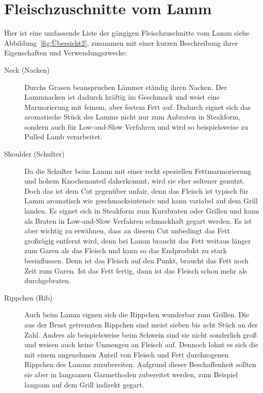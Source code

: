 \section{Fleischzuschnitte vom Lamm}
Hier ist eine umfassende Liste der gängigen Fleischzuschnitte vom Lamm siehe 
Abbildung~\vref{fig:Übersicht2}, zusammen mit einer kurzen Beschreibung 
ihrer Eigenschaften und Verwendungszwecke:

\begin{description}
	\item [Neck  (Nacken)]
	Durchs Grasen beanspruchen Lämmer ständig ihren Nacken. Der 
	Lammnacken ist dadurch kräftig im Geschmack und weist eine Marmorierung 
	mit feinem, aber festem Fett auf. Dadurch eignet sich das aromatische Stück 
	des Lamms nicht nur zum Anbraten in Steakform, sondern auch für 
	Low-and-Slow Verfahren und wird so beispielsweise zu Pulled Lamb 
	verarbeitet.

	\item [Shoulder (Schulter)]
	Da die Schulter beim Lamm mit einer recht speziellen Fettmarmorierung und 
	hohem Knochenanteil daherkommt, wird sie eher seltener genutzt. Doch das 
	ist dem Cut gegenüber unfair, denn das Fleisch ist typisch für Lamm 
	aromatisch wie geschmacksintensiv und kann variabel auf dem Grill landen. 
	Es eignet sich in Steakform zum Kurzbraten oder Grillen und kann als Braten 
	in Low-and-Slow Verfahren schmackhaft gegart werden.
	Es ist aber wichtig zu erwähnen, dass an diesem Cut unbedingt das Fett 
	großzügig entfernt wird, denn bei Lamm braucht das Fett weitaus länger zum 
	Garen als das Fleisch und kann so das Endprodukt zu stark beeinflussen. 
	Denn ist das Fleisch auf den Punkt, braucht das Fett noch Zeit zum Garen. 
	Ist das Fett fertig, dann ist das Fleisch schon mehr als durchgebraten.

	\item [Rippchen (Rib)]
	Auch beim Lamm eignen sich die Rippchen wunderbar zum Grillen. Die aus 
	der Brust getrennten Rippchen sind meist sieben bis acht Stück an der Zahl. 
	Anders als beispielsweise beim Schwein sind sie nicht sonderlich groß und 
	weisen auch keine Unmengen an Fleisch auf. Dennoch lohnt es sich die mit 
	einem angenehmen Anteil von Fleisch und Fett durchzogenen Rippchen des 
	Lamms zuzubereiten. Aufgrund dieser Beschaffenheit sollten sie aber in 
	langsamen Garmethoden zubereitet werden, zum Beispiel langsam auf dem 
	Grill indirekt gegart.
	

\end{description}
